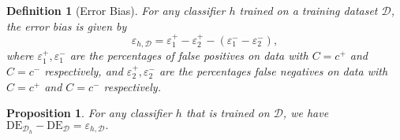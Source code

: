 \documentclass{article}
\newtheorem{definition}{Definition}
\newtheorem{proposition}{Proposition}
\begin{document}
\begin{definition}[Error Bias]
For any classifier $h$ trained on a training dataset $\mathcal{D}$, the error bias is given by
\begin{equation*}
\varepsilon_{h,\mathcal{D}} = \varepsilon_{1}^{+} - \varepsilon_{2}^{+} - (\varepsilon_{1}^{-} - \varepsilon_{2}^{-}),
\end{equation*}
where $\varepsilon_{1}^{+},\varepsilon_{1}^{-}$ are the percentages of false positives on data with $C=c^{+}$ and $C=c^{-}$ respectively, and $\varepsilon_{2}^{+},\varepsilon_{2}^{-}$ are the percentages false negatives on data with $C=c^{+}$ and $C=c^{-}$ respectively.
\end{definition}

\begin{proposition}\label{thm:dhdf}
For any classifier $h$ that is trained on $\mathcal{D}$, we have
$\mathrm{DE}_{\mathcal{D}_{h}} - \mathrm{DE}_{\mathcal{D}} = \varepsilon_{h,\mathcal{D}}.$
\end{proposition}
\end{document}
